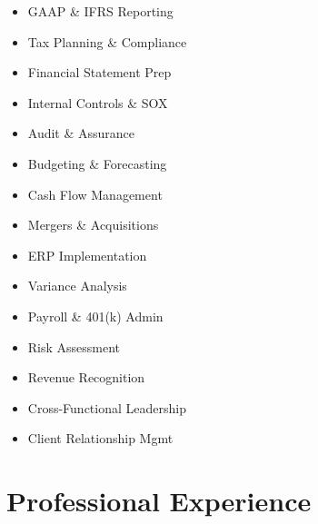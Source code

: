\documentclass[11pt,letterpaper]{article}
\begin{document}
\begin{tcolorbox}[
  colback=lightgray,
  colframe=lightgray,
  boxrule=0pt,
  arc=4pt,
  left=10pt,
  right=10pt,
  top=8pt,
  bottom=8pt,
  boxsep=0pt,
]

\begin{minipage}[t]{0.32\textwidth}
  \raggedright
  \begin{itemize}[leftmargin=*,nosep,itemsep=3pt]
    \item GAAP \& IFRS Reporting
    \item Tax Planning \& Compliance
    \item Financial Statement Prep
    \item Internal Controls \& SOX
    \item Audit \& Assurance
  \end{itemize}
\end{minipage}%
\hfill
\begin{minipage}[t]{0.32\textwidth}
  \raggedright
  \begin{itemize}[leftmargin=*,nosep,itemsep=3pt]
    \item Budgeting \& Forecasting
    \item Cash Flow Management
    \item Mergers \& Acquisitions
    \item ERP Implementation
    \item Variance Analysis
  \end{itemize}
\end{minipage}%
\hfill
\begin{minipage}[t]{0.32\textwidth}
  \raggedright
  \begin{itemize}[leftmargin=*,nosep,itemsep=3pt]
    \item Payroll \& 401(k) Admin
    \item Risk Assessment
    \item Revenue Recognition
    \item Cross-Functional Leadership
    \item Client Relationship Mgmt
  \end{itemize}
\end{minipage}

\end{tcolorbox}

\section{Professional Experience}
\end{document}
